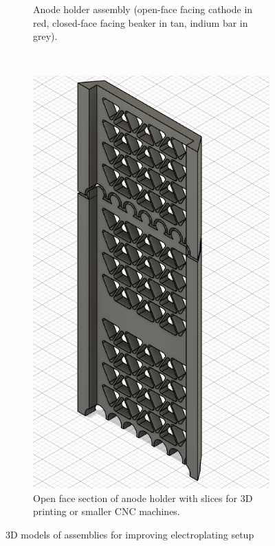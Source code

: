 \begin{figure}
\begin{subfigure}[t]{0.5\textwidth}
        \caption{Anode holder assembly (open-face facing cathode in red, closed-face facing beaker in tan, indium bar in grey).}
    \end{subfigure}
    ~
    \begin{subfigure}[t]{0.5\textwidth}
        \includegraphics[width=\textwidth]{Main/Ch4/3D_models/Anode-Holder-Open-Face.png}
        \caption{Open face section of anode holder with slices for 3D printing or smaller CNC machines.}
    \end{subfigure}
    \caption{3D models of assemblies for improving electroplating setup}
    \label{fig:3D_models}
\end{figure}


